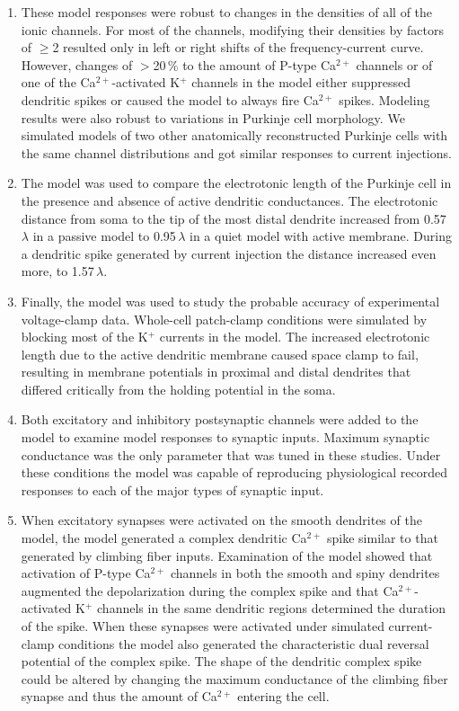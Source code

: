 \documentclass[12pt]{article}
\begin{document}
\begin{enumerate}
\item These model responses were robust to changes in the densities
of all of the ionic channels. For most of the channels, modifying
their densities by factors of $\geq$2 resulted only in left or right
shifts of the frequency-current curve. However, changes of $>$20\,\%
to the amount of P-type Ca$^{2+}$ channels or of one of the Ca$^{2+}$-activated
K$^+$ channels in the model either suppressed dendritic spikes
or caused the model to always fire Ca$^{2+}$ spikes. Modeling results
were also robust to variations in Purkinje cell morphology. We
simulated models of two other anatomically reconstructed Purkinje
cells with the same channel distributions and got similar
responses to current injections.

\item The model was used to compare the electrotonic length of
the Purkinje cell in the presence and absence of active dendritic
conductances. The electrotonic distance from soma to the tip of
the most distal dendrite increased from 0.57\,$\lambda$ in a passive model
to 0.95\,$\lambda$ in a quiet model with active membrane. During a dendritic
spike generated by current injection the distance increased
even more, to 1.57\,$\lambda$.

\item Finally, the model was used to study the probable accuracy
of experimental voltage-clamp data. Whole-cell patch-clamp conditions
were simulated by blocking most of the K$^+$ currents in the
model. The increased electrotonic length due to the active dendritic
membrane caused space clamp to fail, resulting in membrane
potentials in proximal and distal dendrites that differed critically
from the holding potential in the soma.

\item Both excitatory and inhibitory postsynaptic channels were
added to the model to examine model responses to synaptic
inputs. Maximum synaptic conductance was the only parameter
that was tuned in these studies. Under these
conditions the model was capable of reproducing physiological
recorded responses to each of the major types of synaptic input.

\item When excitatory synapses were activated on the smooth
dendrites of the model, the model generated a complex dendritic
Ca$^{2+}$ spike similar to that generated by climbing fiber inputs. Examination
of the model showed that activation of P-type Ca$^{2+}$
channels in both the smooth and spiny dendrites augmented the
depolarization during the complex spike and that Ca$^{2+}$-activated
K$^+$ channels in the same dendritic regions determined the duration
of the spike. When these synapses were activated under simulated
current-clamp conditions the model also generated the characteristic
dual reversal potential of the complex spike. The shape
of the dendritic complex spike could be altered by changing the
maximum conductance of the climbing fiber synapse and thus the
amount of Ca$^{2+}$ entering the cell.


\end{enumerate}
\end{document}
